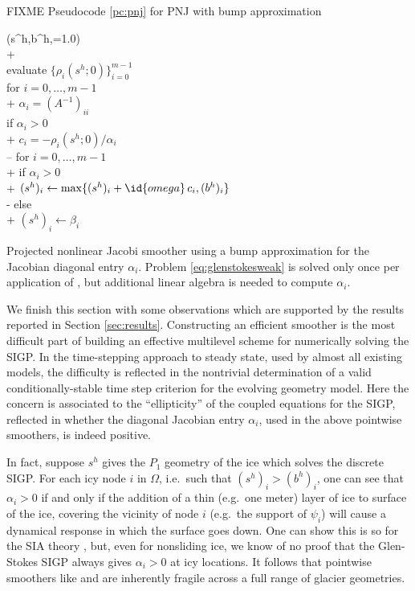 \documentclass[letterpaper,final,12pt,reqno]{amsart}
\theoremstyle{claim}
\numberwithin{equation}{section}
\numberwithin{figure}{section}
\numberwithin{table}{section}
\numberwithin{theorem}{section}
\begin{document}
FIXME Pseudocode \ref{pc:pnj} for PNJ with bump approximation

\begin{pcode}[ht]
\begin{pseudo*}
(s^h,b^h,=1.0)\text{:} \\+
     \\
    evaluate $\{\rho_i(s^h; 0)\}_{i=0}^{m-1}$  \qquad\qquad {} \\
    for $i = 0,\dots,m-1$ \\+
        $\alpha_i = (A^{-1})_{ii}$  \qquad\qquad {} \\
        if $\alpha_i > 0$ \\+
            $c_i = - \rho_i(s^h; 0) / \alpha_i$ \\--
    for $i = 0,\dots,m-1$ \\+
        if $\alpha_i > 0$ \\+
            $(s^h)_i \gets \max\{(s^h)_i + \id{omega}\,c_i, (b^h)_i\}$ \\-
        else \\+
            $(s^h)_i \gets \beta_i$ \qquad\qquad {}
\end{pseudo*}
\caption{Projected nonlinear Jacobi smoother using a bump approximation for the Jacobian diagonal entry $\alpha_i$.  Problem \eqref{eq:glenstokesweak} is solved only once per application of , but additional linear algebra is needed to compute $\alpha_i$.}
\label{pc:pnj}
\end{pcode}

We finish this section with some observations which are supported by the results reported in Section \ref{sec:results}.  Constructing an efficient smoother is the most difficult part of building an effective multilevel scheme for numerically solving the SIGP.  In the time-stepping approach to steady state, used by almost all existing models, the difficulty is reflected in the nontrivial determination of a valid conditionally-stable time step criterion for the evolving geometry model.  Here the concern is associated to the ``ellipticity'' of the coupled equations for the SIGP, reflected in whether the diagonal Jacobian entry $\alpha_i$, used in the above pointwise smoothers, is indeed positive.

In fact, suppose $s^h$ gives the $P_1$ geometry of the ice which solves the discrete SIGP.  For each icy node $i$ in $\Omega$, i.e.~such that $(s^h)_i>(b^h)_i$, one can see that $\alpha_i>0$ if and only if the addition of a thin (e.g.~one meter) layer of ice to surface of the ice, covering the vicinity of node $i$ (e.g.~the support of $\psi_i$) will cause a dynamical response in which the surface goes down.  One can show this is so for the SIA theory \cite{JouvetBueler2012}, but, even for nonsliding ice, we know of no proof that the Glen-Stokes SIGP always gives $\alpha_i>0$ at icy locations.  It follows that pointwise smoothers like  and  are inherently fragile across a full range of glacier geometries.
\end{document}
